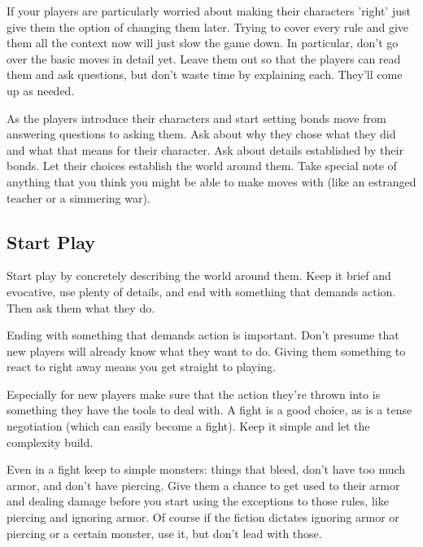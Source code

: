  

If your players are particularly worried about making their characters 'right' just give them the option of changing them later. Trying to cover every rule and give them all the context now will just slow the game down. In particular, don't go over the basic moves in detail yet. Leave them out so that the players can read them and ask questions, but don't waste time by explaining each. They'll come up as needed.

 

As the players introduce their characters and start setting bonds move from answering questions to asking them. Ask about why they chose what they did and what that means for their character. Ask about details established by their bonds. Let their choices establish the world around them. Take special note of anything that you think you might be able to make moves with (like an estranged teacher or a simmering war).

 
\subsection{Start Play}    
 

Start play by concretely describing the world around them. Keep it brief and evocative, use plenty of details, and end with something that demands action. Then ask them what they do.

 

Ending with something that demands action is important. Don't presume that new players will already know what they want to do. Giving them something to react to right away means you get straight to playing.

 

Especially for new players make sure that the action they're thrown into is something they have the tools to deal with. A fight is a good choice, as is a tense negotiation (which can easily become a fight). Keep it simple and let the complexity build.

 

Even in a fight keep to simple monsters: things that bleed, don't have too much armor, and don't have piercing. Give them a chance to get used to their armor and dealing damage before you start using the exceptions to those rules, like piercing and ignoring armor. Of course if the fiction dictates ignoring armor or piercing or a certain monster, use it, but don't lead with those.

 

